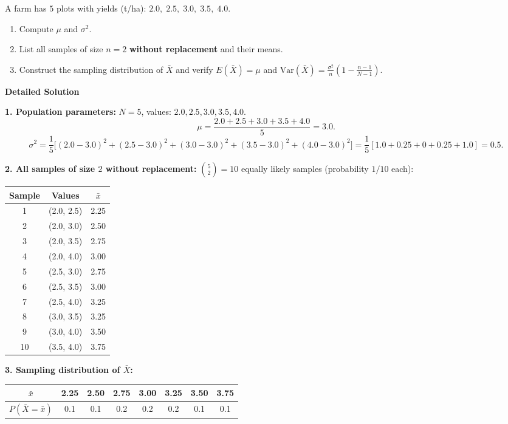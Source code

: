 \documentclass[11pt]{article}
\begin{document}
\begin{exoresolu}
A farm has $5$ plots with yields (t/ha): $2.0,\; 2.5,\; 3.0,\; 3.5,\; 4.0$.
\begin{enumerate}
\item Compute $\mu$ and $\sigma^2$.
\item List all samples of size $n=2$ \textbf{without replacement} and their means.
\item Construct the sampling distribution of $\bar{X}$ and verify $E(\bar{X})=\mu$ and $\mathrm{Var}(\bar{X}) = \frac{\sigma^2}{n}\left(1-\frac{n-1}{N-1}\right)$.
\end{enumerate}
\tcblower
\textbf{Detailed Solution}

\textbf{1. Population parameters:}
$N=5$, values: $2.0, 2.5, 3.0, 3.5, 4.0$.
\[
\mu = \frac{2.0+2.5+3.0+3.5+4.0}{5} = 3.0.
\]
\[
\sigma^2 = \frac{1}{5}\big[(2.0-3.0)^2+(2.5-3.0)^2+(3.0-3.0)^2+(3.5-3.0)^2+(4.0-3.0)^2\big]
= \frac{1}{5}[1.0+0.25+0+0.25+1.0] = 0.5.
\]

\textbf{2. All samples of size $2$ without replacement:}
$\binom{5}{2}=10$ equally likely samples (probability $1/10$ each):

\begin{center}
\begin{tabular}{|c|c|c|}
\hline
Sample & Values & $\bar{x}$ \\
\hline
1 & (2.0, 2.5) & 2.25 \\
2 & (2.0, 3.0) & 2.50 \\
3 & (2.0, 3.5) & 2.75 \\
4 & (2.0, 4.0) & 3.00 \\
5 & (2.5, 3.0) & 2.75 \\
6 & (2.5, 3.5) & 3.00 \\
7 & (2.5, 4.0) & 3.25 \\
8 & (3.0, 3.5) & 3.25 \\
9 & (3.0, 4.0) & 3.50 \\
10 & (3.5, 4.0) & 3.75 \\
\hline
\end{tabular}
\end{center}

\textbf{3. Sampling distribution of $\bar{X}$:}

\begin{center}
\begin{tabular}{|c|c|c|c|c|c|c|c|}
\hline
$\bar{x}$ & 2.25 & 2.50 & 2.75 & 3.00 & 3.25 & 3.50 & 3.75 \\
\hline
$P(\bar{X}=\bar{x})$ & 0.1 & 0.1 & 0.2 & 0.2 & 0.2 & 0.1 & 0.1 \\
\hline
\end{tabular}
\end{center}


\end{exoresolu}
\end{document}
